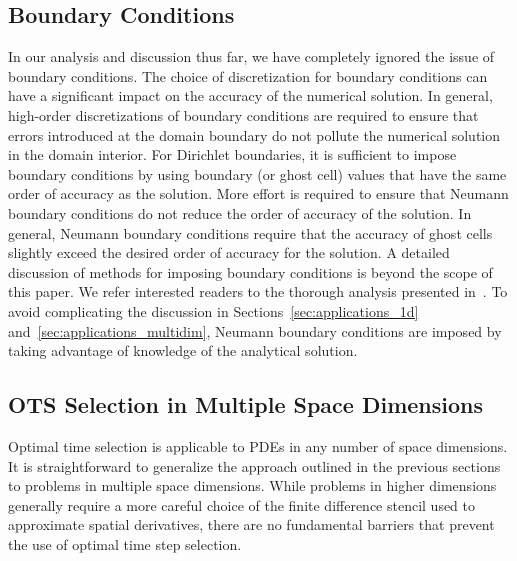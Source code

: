 \documentclass[oneeqnum,onefignum,onetabnum,onethmnum]{siamltex}
\begin{document}
\subsection{Boundary Conditions}
In our analysis and discussion thus far, we have completely ignored the issue 
of boundary conditions.  The choice of discretization for boundary conditions
can have a significant impact on the accuracy of the numerical solution.  In 
general, high-order discretizations of boundary conditions are required to 
ensure that errors introduced at the domain boundary do not pollute the 
numerical solution in the domain interior.  For Dirichlet boundaries, it
is sufficient to impose boundary conditions by using boundary (or ghost cell) 
values that have the same order of accuracy as the solution.  
More effort is required to ensure that Neumann boundary conditions do not
reduce the order of accuracy of the solution.  In general, Neumann boundary
conditions require that the accuracy of ghost cells slightly exceed the 
desired order of accuracy for the solution.  A detailed discussion of 
methods for imposing boundary conditions is beyond the scope of this paper.  
We refer interested readers to the thorough analysis presented
in~\cite{gko_book}.  To avoid complicating the discussion in 
Sections~\ref{sec:applications_1d} and~\ref{sec:applications_multidim}, 
Neumann boundary conditions are imposed by taking advantage of knowledge of 
the analytical solution.


\subsection{\label{sec:ots_higher_spatial_dims}
            OTS Selection in Multiple Space Dimensions}
Optimal time selection is applicable to PDEs in any number of space
dimensions.  It is straightforward to generalize the approach outlined in 
the previous sections to problems in multiple space dimensions.  While 
problems in higher dimensions generally require a more careful choice of 
the finite difference stencil used to approximate spatial derivatives,
there are no fundamental barriers that prevent the use of optimal time step 
selection.
\end{document}
